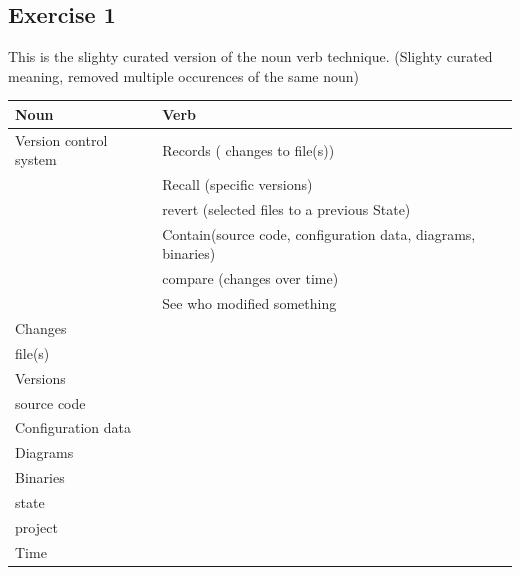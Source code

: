\documentclass{article}
\begin{document}
\subsection*{Exercise 1}
This is the slighty curated version of the noun verb technique. (Slighty curated meaning, removed multiple occurences of the same noun)
\begin{table}[!htb]
    \begin{tabular}{l|l}
    \hline
    \multicolumn{1}{|l|}{Noun} & \multicolumn{1}{l|}{Verb}                                    \\ \hline
    Version control system     & Records ( changes to file(s))                                \\
                               & Recall (specific versions)                                   \\
                               & revert (selected files to a previous State)                  \\
                               & Contain(source code, configuration data, diagrams, binaries) \\
                               & compare (changes over time)                                  \\
                               & See who modified something                                   \\
    Changes                    &                                                              \\
    file(s)                    &                                                              \\
    Versions                   &                                                              \\
    source code                &                                                              \\
    Configuration data         &                                                              \\
    Diagrams                   &                                                              \\
    Binaries                   &                                                              \\
    state                      &                                                              \\
    project                    &                                                              \\
    Time                       &                                                             
    \end{tabular}
    \end{table}
\end{document}

